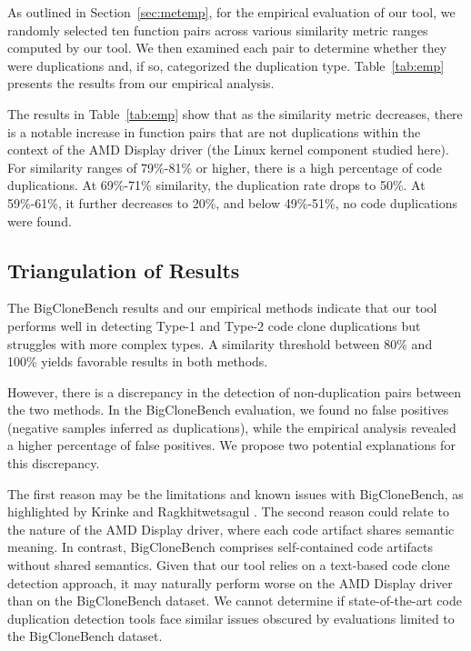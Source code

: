 As outlined in Section~\ref{sec:metemp}, for the empirical evaluation of our tool, we randomly selected ten function pairs across various similarity metric ranges computed by our tool. We then examined each pair to determine whether they were duplications and, if so, categorized the duplication type. Table~\ref{tab:emp} presents the results from our empirical analysis.



The results in Table~\ref{tab:emp} show that as the similarity metric decreases, 
there is a notable increase in function pairs that are not duplications within 
the context of the AMD Display driver (the Linux kernel component studied here). 
For similarity ranges of 79\%-81\% or higher, there is a high 
percentage of code duplications. At 69\%-71\% similarity, the duplication rate 
drops to 50\%. At 59\%-61\%, it further decreases to 20\%, and below 49\%-51\%, 
no code duplications were found.

\subsection{Triangulation of Results}

The BigCloneBench results and our empirical methods indicate that our tool performs well in detecting Type-1 and Type-2 code clone duplications but struggles with more complex types. A similarity threshold between 80\% and 100\% yields favorable results in both methods.

However, there is a discrepancy in the detection of non-duplication pairs between the two methods. In the BigCloneBench evaluation, we found no false positives (negative samples inferred as duplications), while the empirical analysis revealed a higher percentage of false positives. We propose two potential explanations for this discrepancy.

The first reason may be the limitations and known issues with BigCloneBench, as highlighted by Krinke and Ragkhitwetsagul \citep{bigfail}. The second reason could relate to the nature of the AMD Display driver, where each code artifact shares semantic meaning. In contrast, BigCloneBench comprises self-contained code artifacts without shared semantics. Given that our tool relies on a text-based code clone detection approach, it may naturally perform worse on the AMD Display driver than on the BigCloneBench dataset. We cannot determine if state-of-the-art code duplication detection tools face similar issues obscured by evaluations limited to the BigCloneBench dataset.

